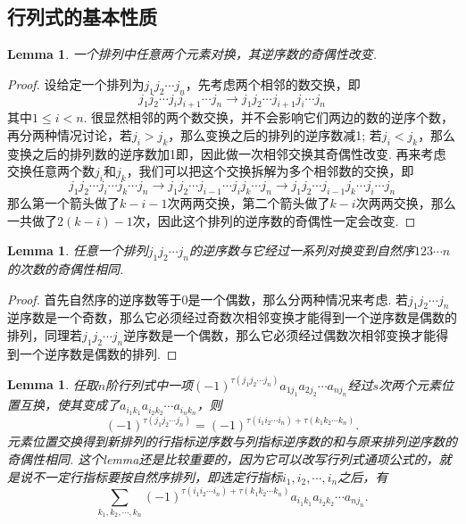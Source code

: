 \documentclass{article}
\newtheorem{lemma}[theorem]{Lemma}
\begin{document}
\newpage
\subsection{行列式的基本性质}
\begin{lemma}\label{det: nixu}
\rm 一个排列中任意两个元素对换，其逆序数的奇偶性改变.
\end{lemma}

\begin{proof}
设给定一个排列为$j_1j_2\cdots j_n$，先考虑两个相邻的数交换，即
$$
j_1j_2\cdots j_{i}j_{i+1}\cdots j_n \longrightarrow j_1j_2\cdots j_{i+1}j_{i}\cdots j_n
$$
其中$1\leq i <n$. 很显然相邻的两个数交换，并不会影响它们两边的数的逆序个数，再分两种情况讨论，若$j_i > j_k$，那么变换之后的排列的逆序数减1; 若$j_i < j_k$，那么变换之后的排列数的逆序数加1即，因此做一次相邻交换其奇偶性改变. 再来考虑交换任意两个数$j_i$和$j_k$，我们可以把这个交换拆解为多个相邻数的交换，即
$$
j_1j_2\cdots j_{i}\cdots j_{k}\cdots j_n \longrightarrow j_1j_2\cdots j_{i-1}\cdots j_{i}j_{k}\cdots j_n \longrightarrow j_1j_2\cdots j_{i-1}j_k\cdots j_{i}\cdots j_n
$$
那么第一个箭头做了$k-i-1$次两两交换，第二个箭头做了$k-i$次两两交换，那么一共做了$2(k-i)-1$次，因此这个排列的逆序数的奇偶性一定会改变.
\end{proof}

\begin{lemma}\label{det: nixu2}
\rm 任意一个排列$j_1j_2\cdots j_n$的逆序数与它经过一系列对换变到自然序$123\cdots n$的次数的奇偶性相同.
\end{lemma}

\begin{proof}
首先自然序的逆序数等于0是一个偶数，那么分两种情况来考虑. 若$j_1j_2\cdots j_n$逆序数是一个奇数，那么它必须经过奇数次相邻变换才能得到一个逆序数是偶数的排列，同理若$j_1j_2\cdots j_n$逆序数是一个偶数，那么它必须经过偶数次相邻变换才能得到一个逆序数是偶数的排列.
\end{proof}


\begin{lemma}\label{det: nixu3}
\rm 任取$n$阶行列式中一项$(-1)^{\tau(j_1j_2\cdots j_n)}a_{1j_1}a_{2j_2}\cdots a_{nj_n}$经过$s$次两个元素位置互换，使其变成了$a_{i_1k_1}a_{i_2k_2}\cdots a_{i_nk_n}$，则
$$
(-1)^{\tau(j_1j_2\cdots j_n)} = (-1)^{\tau(i_1i_2\cdots i_n)+\tau(k_1k_2\cdots k_n)}.
$$
{\color{blue} 元素位置交换得到新排列的行指标逆序数与列指标逆序数的和与原来排列逆序数的奇偶性相同}. {\color{red} 这个lemma还是比较重要的，因为它可以改写行列式通项公式的，就是说不一定行指标要按自然序排列}，即选定行指标$i_1,i_2,\cdots,i_n$之后，有
$$
\sum\limits_{k_1,k_2,\cdots,k_n}(-1)^{\tau(i_1i_2\cdots i_n) + \tau(k_1k_2\cdots k_n)}a_{i_1k_1}a_{i_2k_2}\cdots a_{nj_n}.
$$
\end{lemma}
\end{document}
